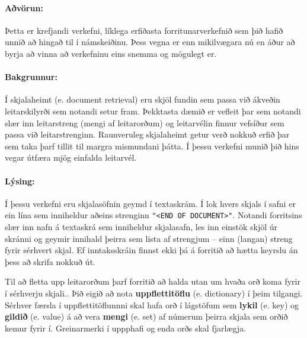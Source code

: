 
\paragraph{Aðvörun:}
Þetta er krefjandi verkefni, líklega erfiðasta forritunarverkefnið sem þið hafið unnið að hingað til í námskeiðinu.
Þess vegna er enn mikilvægara nú en áður að byrja að vinna að verkefninu eins snemma og mögulegt er. 

\paragraph{Bakgrunnur:} 
Í skjalaheimt (e. document retrieval) eru skjöl fundin sem passa við ákveðin leitarskilyrði sem notandi setur fram. 
Þekktasta dæmið er vefleit þar sem notandi slær inn leitarstreng (mengi af leitarorðum) og leitarvélin finnur vefsíður sem passa við leitarstrenginn. 
Raunveruleg skjalaheimt getur verð nokkuð erfið þar sem taka þarf tillit til margra mismundani þátta. 
Í þessu verkefni munið þið hins vegar útfæra mjög einfalda leitarvél.

\paragraph{Lýsing:}
Í þessu verkefni eru skjalasöfnin geymd í textaskrám. 
Í lok hvers skjals í safni er ein lína sem inniheldur aðeins strenginn \texttt{"<END OF DOCUMENT>"}. 
Notandi forritsins slær inn nafn á textaskrá sem inniheldur skjalasafn, les inn einstök skjöl úr skránni og geymir innihald þeirra sem lista af strengjum -- einn (langan) streng fyrir sérhvert skjal. 
Ef inntaksskráin finnst ekki þá á forritið að hætta keyrslu án þess að skrifa nokkuð út.

Til að fletta upp leitarorðum þarf forritið að halda utan um hvaða orð koma fyrir í sérhverju skjali..
Þið eigið að nota \textbf{uppflettitöflu} (e. dictionary) í þeim tilgangi. 
Sérhver færsla í uppflettitöflunnni skal hafa orð í lágstöfum sem \textbf{lykil} (e. key) og \textbf{gildið} (e. value) á að vera \textbf{mengi} (e. set) af númerum þeirra skjala sem orðið kemur fyrir í. 
Greinarmerki í uppphafi og enda orðs skal fjarlægja.

